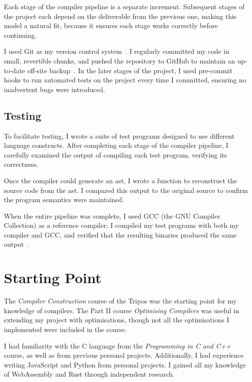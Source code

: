 \documentclass[00-main.tex]{subfiles}
\begin{document}
Each stage of the compiler pipeline is a separate increment.
Subsequent stages of the project each depend on the deliverable from the previous one, making this model a natural fit, because it ensures each stage works correctly before continuing.

I used Git as my version control system~.
I regularly committed my code in small, revertible chunks, and pushed the repository to GitHub to maintain an up-to-date off-site backup~.
In the later stages of the project, I used pre-commit hooks to run automated tests on the project every time I committed, ensuring no inadvertent bugs were introduced.

\subsection{Testing}

To facilitate testing, I wrote a suite of test programs designed to use different language constructs.
After completing each stage of the compiler pipeline, I carefully examined the output of compiling each test program, verifying its correctness.

Once the compiler could generate an \gls{ast}, I wrote a function to reconstruct the source code from the \gls{ast}.
I compared this output to the original source to confirm the program semantics were maintained.

When the entire pipeline was complete, I used GCC (the GNU Compiler Collection) as a reference compiler; I compiled my test programs with both my compiler and GCC, and verified that the resulting binaries produced the same output~.

\section{Starting Point}

The \emph{Compiler Construction} course of the Tripos was the starting point for my knowledge of compilers.
The Part II course \emph{Optimising Compilers} was useful in extending my project with optimisations, though not all the optimisations I implemented were included in the course.

I had familiarity with the C language from the \emph{Programming in C and C++} course, as well as from previous personal projects.
Additionally, I had experience writing JavaScript and Python from personal projects.
I gained all my knowledge of WebAssembly and Rust through independent research.
\end{document}
